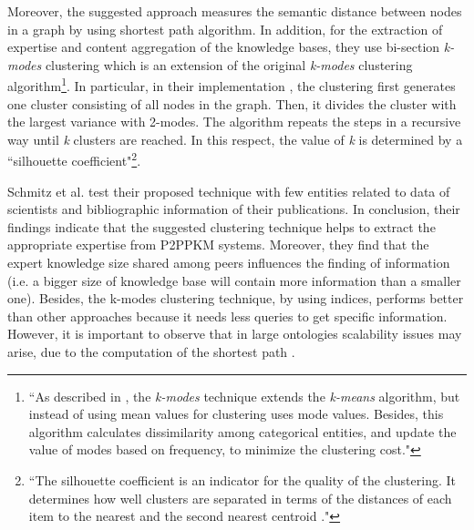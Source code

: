 \documentclass[runningheads]{llncs}
\begin{document}
Moreover, the suggested approach measures the semantic distance between nodes in a graph by using shortest path algorithm. In addition, for the extraction of expertise and content aggregation of the knowledge bases, they use bi-section {\textit{k-modes}} clustering which is an extension of the original {\textit{k-modes}} clustering algorithm\footnote{``As described in \cite{Huang}, the {\textit{k-modes}} technique extends the {\textit{k-means}} algorithm, but instead of using mean values for clustering uses mode values. Besides, this algorithm calculates dissimilarity among categorical entities, and update the value of modes based on frequency, to minimize the clustering cost."}. In particular, in their implementation \cite{Schmitz}, the clustering first generates one cluster consisting of all nodes in the graph. Then, it divides the cluster with the largest variance with 2-modes. The algorithm repeats the steps in a recursive way until {\textit{k}} clusters are reached. In this respect, the value of {\textit{k}} is determined by a ``silhouette coefficient"\footnote{``The silhouette coefficient is an indicator for the quality of the clustering. It determines how well clusters are separated in terms of the distances of each item to the nearest and the second nearest centroid \cite{Schmitz}."}.

Schmitz et al. \cite{Schmitz} test their proposed technique with few entities related to data of scientists and bibliographic information of their publications. In conclusion, their findings indicate that the suggested clustering technique helps to extract the appropriate expertise from P2PPKM systems. Moreover, they find that the expert knowledge size shared among peers influences the finding of information (i.e. a bigger size of knowledge base will contain more information than a smaller one). Besides, the k-modes clustering technique, by using indices, performs better than other approaches because it needs less queries to get specific information. 
However, it is important to observe that in large ontologies scalability issues may arise, due to the computation of the shortest path \cite{Schmitz}.
\end{document}
